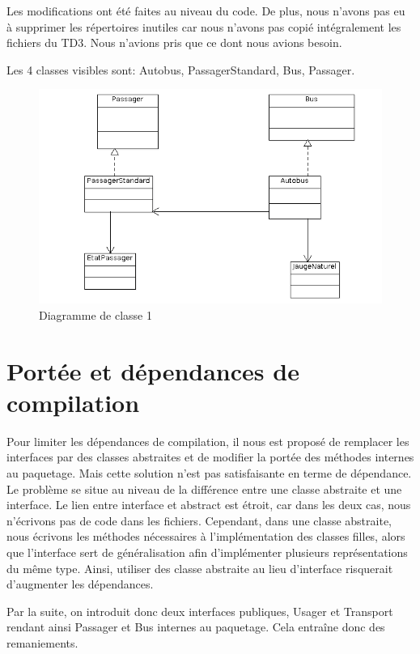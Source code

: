 \documentclass[a4paper,11pt]{article}
\begin{document}
Les modifications ont été faites au niveau du code. De plus, nous n'avons pas eu à supprimer les répertoires inutiles car nous n'avons pas copié intégralement les 
fichiers du TD3. Nous n'avions pris que ce dont nous avions besoin.

Les 4 classes visibles sont: Autobus, PassagerStandard, Bus, Passager.

\begin{figure}[h]
   \caption{Diagramme de classe 1}
   \includegraphics[scale=0.6]{figure1.png}
\end{figure}

\section{Portée et dépendances de compilation}

Pour limiter les dépendances de compilation, il nous est proposé de remplacer les interfaces par des classes abstraites et de modifier la portée des méthodes
internes au paquetage. Mais cette solution n'est pas satisfaisante en terme de dépendance. Le problème se situe au niveau de la différence entre une classe
abstraite et une interface. Le lien entre interface et abstract est étroit, car dans les deux cas, nous n'écrivons pas de code dans les fichiers. Cependant, dans 
une classe abstraite, nous écrivons les méthodes nécessaires à l'implémentation des classes filles, alors que l'interface sert de généralisation afin d'implémenter
plusieurs représentations du même type. Ainsi, utiliser des classe abstraite au lieu d'interface risquerait d'augmenter les dépendances.

Par la suite, on introduit donc deux interfaces publiques, Usager et Transport rendant ainsi Passager et Bus internes au paquetage. Cela entraîne donc des
remaniements.
\end{document}
